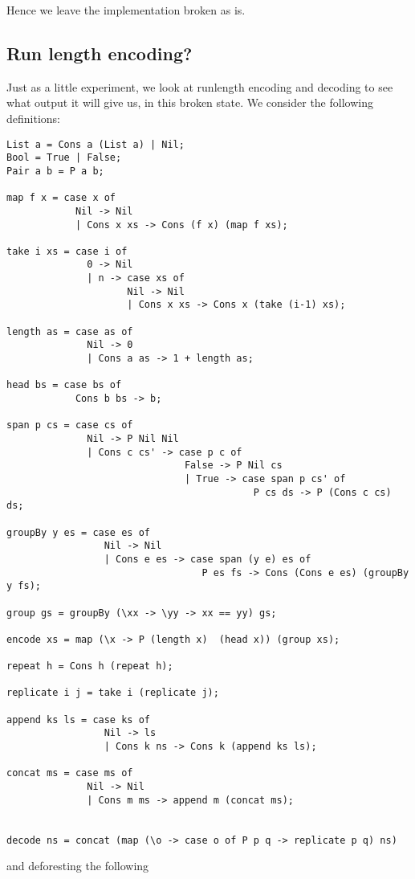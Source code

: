 \documentclass[a4paper, openany]{article}
\begin{document}
Hence we leave the implementation broken as is.


\subsection{Run length encoding?}
\label{sec:orgd80097d}
Just as a little experiment, we look at runlength encoding and decoding to see what output it will give us, in this broken state.
We consider the following definitions:
\begin{lstlisting}[mathescape=true]
List a = Cons a (List a) | Nil;
Bool = True | False;
Pair a b = P a b;

map f x = case x of
            Nil -> Nil
            | Cons x xs -> Cons (f x) (map f xs);

take i xs = case i of
              0 -> Nil
              | n -> case xs of
                     Nil -> Nil
                     | Cons x xs -> Cons x (take (i-1) xs);

length as = case as of
              Nil -> 0
              | Cons a as -> 1 + length as;

head bs = case bs of
            Cons b bs -> b;

span p cs = case cs of
              Nil -> P Nil Nil
              | Cons c cs' -> case p c of
                               False -> P Nil cs
                               | True -> case span p cs' of
                                           P cs ds -> P (Cons c cs) ds;

groupBy y es = case es of
                 Nil -> Nil
                 | Cons e es -> case span (y e) es of
                                  P es fs -> Cons (Cons e es) (groupBy y fs);

group gs = groupBy (\xx -> \yy -> xx == yy) gs;

encode xs = map (\x -> P (length x)  (head x)) (group xs);

repeat h = Cons h (repeat h);

replicate i j = take i (replicate j);

append ks ls = case ks of
                 Nil -> ls
                 | Cons k ns -> Cons k (append ks ls);

concat ms = case ms of
              Nil -> Nil
              | Cons m ms -> append m (concat ms);


decode ns = concat (map (\o -> case o of P p q -> replicate p q) ns)
\end{lstlisting}

and deforesting the following
\end{document}
